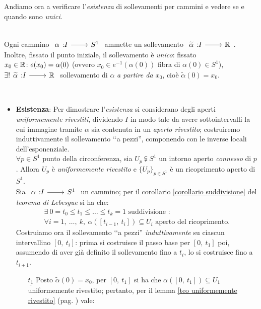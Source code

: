 Andiamo ora a verificare l'\textit{esistenza} di sollevamenti per cammini e vedere se e quando sono \textit{unici}.
\begin{theorema}~{}\label{teo sollevamento cammini}\\
Ogni cammino $\funz \alpha I {S^1}$ ammette un sollevamento $\funz {\widetilde{\alpha}} I \realset$. Inoltre, fissato il punto iniziale, il sollevamento è \textit{unico}: fissato $x_0\in\mathbb{R} \colon e(x_0)=\alpha(0)$ (ovvero $x_0\in e^{-1}(\alpha(0))$ fibra di $\alpha(0)\in S^1$),  $\exists ! \funz {\widetilde{\alpha}} I \realset$ sollevamento di $\alpha$ \textit{a partire da $x_0$}, cioè $\widetilde{\alpha}(0)=x_0$.
\end{theorema}
\begin{demonstration}~{}
	\begin{itemize}
		\item \textbf{Esistenza}: Per dimostrare l'\textit{esistenza} si considerano degli aperti \textit{uniformemente rivestiti}, dividendo $I$ in modo tale da avere sottointervalli la cui immagine tramite $\alpha$ sia contenuta in un \textit{aperto rivestito}; costruiremo induttivamente il sollevamento ‘‘a pezzi'', componendo con le inverse locali dell'esponenziale.\\
		$\forall p\in S^1$ punto della circonferenza, sia $U_p\subsetneqq S^1$ un intorno aperto \textit{connesso} di $p$. Allora $U_p$ è \textit{uniformemente rivestito} e $\{U_p\}_{p\in S^1}$ è un ricoprimento aperto di $S^1$.\\
		Sia $\funz \alpha I {S^1}$ un cammino; per il corollario \ref{corollario suddivisione} del \textit{teorema di Lebesgue} si ha che:
		\begin{equation*}
			\begin{array}{l}
				\exists\ 0=t_0\leq t_1\leq\dots\leq t_k=1\text{ suddivisione }\colon \\
				\forall i=1,\ \dots,\  k,\ \alpha([t_{i-1},\ t_i])\subseteq U_i\text{ aperto del ricoprimento.}
			\end{array}
		\end{equation*}
		Costruiamo ora il sollevamento ‘‘a pezzi'' \textit{induttivamente} su ciascun intervallino $[0,\ t_i]$: prima si costruisce il passo base per $[0,\ t_1]$ poi, assumendo di aver già definito il sollevamento fino a $t_i$, lo si costruisce fino a $t_{i+1}$.\\
		\begin{enumerate}
			\item[$\underline{t_1}$] Posto $\widetilde{\alpha}(0)=x_0$, per $[0,\ t_1]$ si ha che $\alpha\left([0,\ t_1]\right)\subseteq U_1$ uniformemente rivestito; pertanto, per il lemma \ref{teo uniformemente rivestito} (pag. \pageref{teo uniformemente rivestito}) vale:

\end{enumerate}
\end{itemize}
\end{demonstration}
